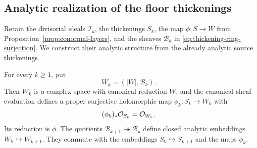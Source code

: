 \subsection{Analytic realization of the floor thickenings}
\label{subsec:analytic-thickenings}

Retain the divisorial ideals \(\mathscr I_k\), the thickenings \(S_k\),
the map \(\phi:S\to W\) from Proposition~\ref{prop:conormal-layers},
and the sheaves \(\mathscr B_k\) in
\eqref{eq:thickening-ring-surjection}.  We construct their analytic
structure from the already analytic source thickenings.

\begin{lemma}\label{lem:analytic-thickenings}
For every \(k\geq1\), put
\[
 W_k=(|W|,\mathscr B_k).
\]
Then \(W_k\) is a complex space with canonical reduction \(W\), and
the canonical sheaf evaluation defines a proper surjective holomorphic
map \(\phi_k:S_k\to W_k\) with
\[
 (\phi_k)_*\mathcal O_{S_k}=\mathcal O_{W_k}.
\]
Its reduction is \(\phi\).  The quotients
\(\mathscr B_{k+1}\twoheadrightarrow\mathscr B_k\) define closed
analytic embeddings \(W_k\hookrightarrow W_{k+1}\).  They commute
with the embeddings \(S_k\hookrightarrow S_{k+1}\) and the maps
\(\phi_k\).
\end{lemma}
